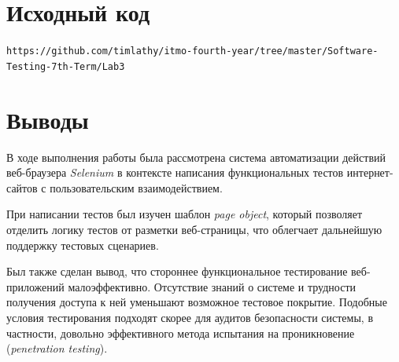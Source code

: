 \documentclass[listings]{labreport}
\begin{document}
\section*{Исходный код}

\verb|https://github.com/timlathy/itmo-fourth-year/tree/master/Software-Testing-7th-Term/Lab3|

\section*{Выводы}

В ходе выполнения работы была рассмотрена система автоматизации действий веб-браузера \textit{Selenium}
в контексте написания функциональных тестов интернет-сайтов с пользовательским взаимодействием.

При написании тестов был изучен шаблон \textit{page object}, который позволяет отделить логику тестов
от разметки веб-страницы, что облегчает дальнейшую поддержку тестовых сценариев.

Был также сделан вывод, что стороннее функциональное тестирование веб-приложений малоэффективно.
Отсутствие знаний о системе и трудности получения доступа к ней уменьшают возможное тестовое покрытие.
Подобные условия тестирования подходят скорее для аудитов безопасности системы, в частности, довольно
эффективного метода испытания на проникновение (\textit{penetration testing}).
\end{document}
